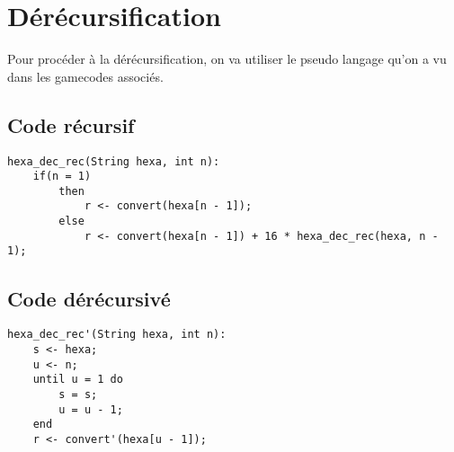 \documentclass[a4paper, 11pt, oneside]{article}
\begin{document}
\section{Dérécursification}\label{derecur}
%
%
Pour procéder à la dérécursification, on va utiliser le pseudo langage qu'on a vu dans les gamecodes associés.

\subsection{Code récursif}

\begin{lstlisting}
hexa_dec_rec(String hexa, int n):
    if(n = 1)
        then
            r <- convert(hexa[n - 1]);
        else
            r <- convert(hexa[n - 1]) + 16 * hexa_dec_rec(hexa, n - 1);
\end{lstlisting}

\subsection{Code dérécursivé}

\begin{lstlisting}
hexa_dec_rec'(String hexa, int n):
    s <- hexa;
    u <- n;
    until u = 1 do
        s = s;
        u = u - 1;
    end
    r <- convert'(hexa[u - 1]);
\end{lstlisting}
\end{document}
